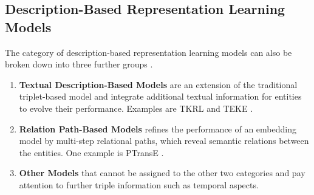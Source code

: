 \subsection{Description-Based Representation Learning Models}
\label{subsec:description_based_representation_learning_models}

The category of description-based representation learning models can also be broken down into three further groups \cite{electronics9050750}.
\begin{enumerate}
    \item 
    \textbf{Textual Description-Based Models} are an extension of the traditional triplet-based model and integrate additional textual information for entities to evolve their performance.
    Examples are \ac{TKRL} \cite{TKRL} and \ac{TEKE} \cite{TEKE}.
    
    \item 
    \textbf{Relation Path-Based Models} refines the performance of an embedding model by multi-step relational paths, which reveal semantic relations between the entities.
    One example is \ac{PTransE} \cite{PTransE}.
    
    \item 
    \textbf{Other Models} that cannot be assigned to the other two categories and pay attention to further triple information such as temporal aspects.
\end{enumerate}